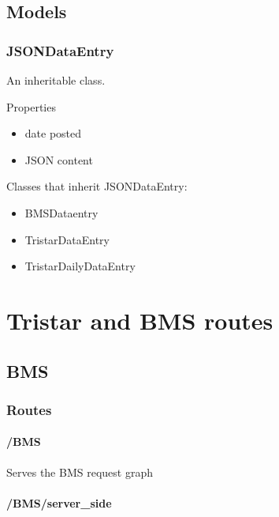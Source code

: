 \subsection{Models}\label{models-1}

\subsubsection{JSONDataEntry}\label{jsondataentry}

An inheritable class.

Properties

\begin{itemize}
\itemsep1pt\parskip0pt
\item
  date posted
\item
  JSON content
\end{itemize}

Classes that inherit JSONDataEntry:

\begin{itemize}
\itemsep1pt\parskip0pt
\item
  BMSDataentry
\item
  TristarDataEntry
\item
  TristarDailyDataEntry
\end{itemize}

\section{Tristar and BMS routes}\label{tristar-and-bms-routes}

\subsection{BMS}\label{bms}

\subsubsection{Routes}\label{routes-1}

\paragraph{/BMS}\label{bms-1}

Serves the BMS request graph

\paragraph{/BMS/server\_side}\label{bmsserverux5fside}

